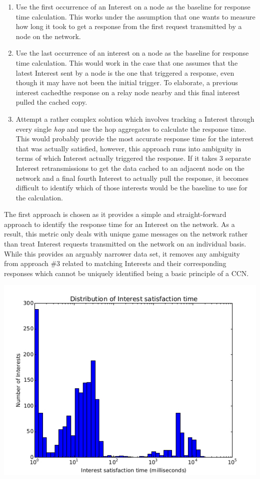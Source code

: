 \documentclass[a4paper,12pt]{report}      %
\begin{document}
\begin{enumerate}
\item Use the first occurrence of an Interest on a node as the baseline for response time calculation. This
works under the assumption that one wants to measure how long it took to get a response from the first
request transmitted by a node on the network.

\item Use the last occurrence of an interest on a node as the baseline for response time calculation. This
would work in the case that one assumes that the latest Interest sent by a node is the one that triggered a
response, even though it may have not been the initial trigger. To elaborate, a previous interest cachedthe response on a relay node nearby and this final interest pulled the cached copy.

\item Attempt a rather complex solution which involves tracking a Interest through every single \textsl{hop} and
use the hop aggregates to calculate the response time. This would probably provide the most accurate
response time for the interest that was actually satisfied, however, this approach runs into ambiguity in
terms of which Interest actually triggered the response. If it takes 3 separate Interest retransmissions to
get the data cached to an adjacent node on the network and a final fourth Interest to actually pull the
response, it becomes difficult to identify which of those interests would be the baseline to use for the
calculation.
\end{enumerate}

The first approach is chosen as it provides a simple and straight-forward approach to identify the
response time for an Interest on the network. As a result, this metric only deals with unique game
messages on the network rather than treat Interest requests transmitted on the network on an individual
basis. While this provides an arguably narrower data set, it removes any ambiguity from approach \#3
related to matching Interests and their corresponding responses which cannot be uniquely identified
being a basic principle of a CCN.

\includegraphics[scale=0.73]{InterestResponseTimeHist.jpg}
\end{document}
